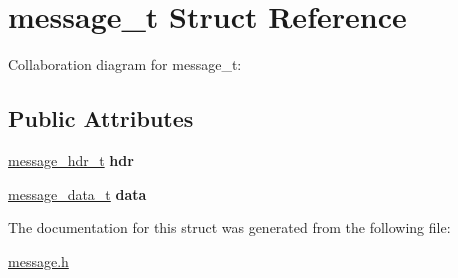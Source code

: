 \hypertarget{structmessage__t}{}\section{message\+\_\+t Struct Reference}
\label{structmessage__t}


Collaboration diagram for message\+\_\+t\+:
\subsection*{Public Attributes}
\begin{DoxyCompactItemize}
\item 
\mbox{\label{structmessage__t_a6c9e3c76c26fd15afd27fca633875978}} 
\hyperlink{structmessage__hdr__t}{message\+\_\+hdr\+\_\+t} {\bfseries hdr}
\item 
\mbox{\label{structmessage__t_a4246f40b480c7d84ff6319ef2ae7b305}} 
\hyperlink{structmessage__data__t}{message\+\_\+data\+\_\+t} {\bfseries data}
\end{DoxyCompactItemize}


The documentation for this struct was generated from the following file\+:\begin{DoxyCompactItemize}
\item 
\hyperlink{message_8h}{message.\+h}\end{DoxyCompactItemize}
